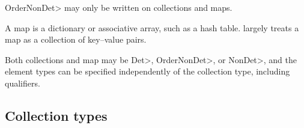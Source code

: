 \<OrderNonDet> may only be written on collections and maps.

A map is a dictionary or associative array, such as a hash table.
\OurTypeSystem largely treats a map as a collection of key--value pairs.

Both collections and map may be \<Det>, \<OrderNonDet>, or \<NonDet>, and
the element types can be specified independently of the collection type,
including qualifiers.



\subsection{Collection types}\label{collection-rules}


